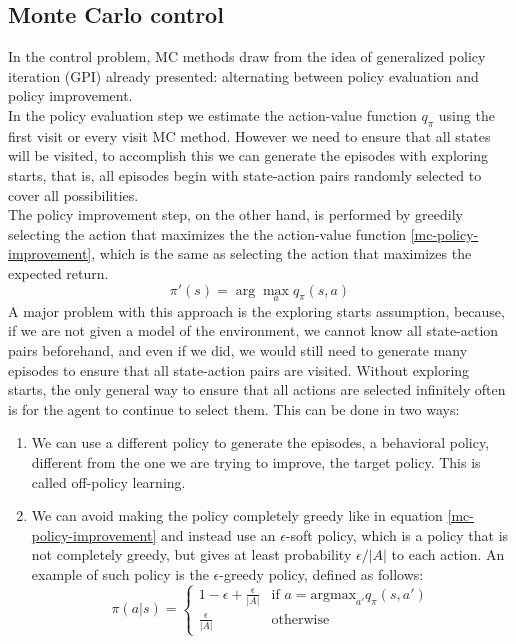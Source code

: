 \subsection{Monte Carlo control}
In the control problem, MC methods draw from the idea of generalized policy iteration (GPI) already presented: alternating between policy evaluation and policy improvement.\\
In the policy evaluation step we estimate the action-value function $q_{\pi}$ using the first visit or every visit MC method. However we need to ensure that all states will be visited, to accomplish this we can generate the episodes with exploring starts, that is, all episodes begin with state-action pairs randomly selected to cover all possibilities.\\
The policy improvement step, on the other hand, is performed by greedily selecting the action that maximizes the the action-value function \ref{mc-policy-improvement}, which is the same as selecting the action that maximizes the expected return.
\begin{equation}
    \pi'(s) = \arg \max_a q_{\pi}(s, a)
    \label{mc-policy-improvement}
\end{equation}
A major problem with this approach is the exploring starts assumption, because, if we are not given a model of the environment, we cannot know all state-action pairs beforehand, and even if we did, we would still need to generate many episodes to ensure that all state-action pairs are visited. Without exploring starts, the only general way to ensure that all actions are selected infinitely often is for the agent to continue to select them. This can be done in two ways:
\begin{enumerate}
    \item We can use a different policy to generate the episodes, a behavioral policy, different from the one we are trying to improve, the target policy. This is called off-policy learning.
    \item We can avoid making the policy completely greedy like in equation \ref{mc-policy-improvement} and instead use an $\epsilon$-soft policy, which is a policy that is not completely greedy, but gives at least probability $\epsilon / |A|$ to each action. An example of such policy is the $\epsilon$-greedy policy, defined as follows:
    \begin{equation}
        \pi(a|s) = \begin{cases}
            1 - \epsilon + \frac{\epsilon}{|A|} & \text{if } a = \mathrm{argmax}_{a'} q_{\pi}(s, a') \\
            \frac{\epsilon}{|A|} & \text{otherwise}
        \end{cases}
        \label{epsilon-greedy-policy}
    \end{equation}
\end{enumerate}

